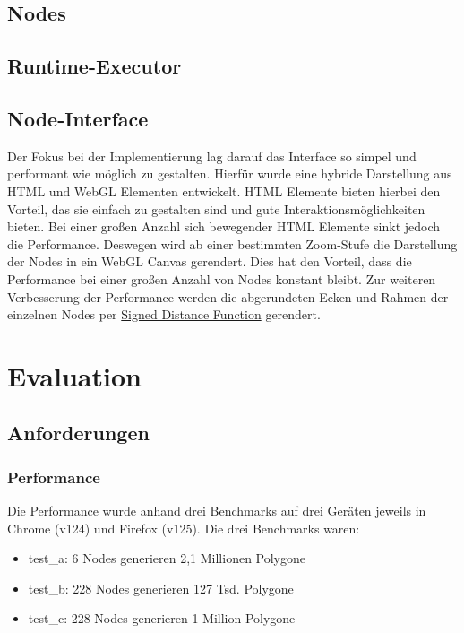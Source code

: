 \documentclass[ngerman]{article}
\begin{document}
\subsection{Nodes}

\subsection{Runtime-Executor}

\subsection{Node-Interface}
Der Fokus bei der Implementierung lag darauf das Interface so simpel und performant wie möglich zu gestalten. Hierfür wurde eine hybride Darstellung aus HTML und WebGL Elementen entwickelt. HTML Elemente bieten hierbei den Vorteil, das sie einfach zu gestalten sind und gute Interaktionsmöglichkeiten bieten. Bei einer großen Anzahl sich bewegender HTML Elemente sinkt jedoch die Performance. 
Deswegen wird ab einer bestimmten Zoom-Stufe die Darstellung der Nodes in ein WebGL Canvas gerendert. Dies hat den Vorteil, dass die Performance bei einer großen Anzahl von Nodes konstant bleibt. 
Zur weiteren Verbesserung der Performance werden die abgerundeten Ecken und Rahmen der einzelnen Nodes per \href{https://en.wikipedia.org/wiki/Signed_distance_function}{Signed Distance Function} gerendert.

\pagebreak


\section{Evaluation}


\subsection{Anforderungen}


\subsubsection{Performance}

Die Performance wurde anhand drei Benchmarks auf drei Geräten jeweils in Chrome (v124) und Firefox (v125). Die drei Benchmarks waren:

\begin{itemize}
  \item test\_a: 6 Nodes generieren 2,1 Millionen Polygone
  \item test\_b: 228 Nodes generieren 127 Tsd. Polygone
  \item test\_c: 228 Nodes generieren 1 Million Polygone
\end{itemize}
\end{document}
